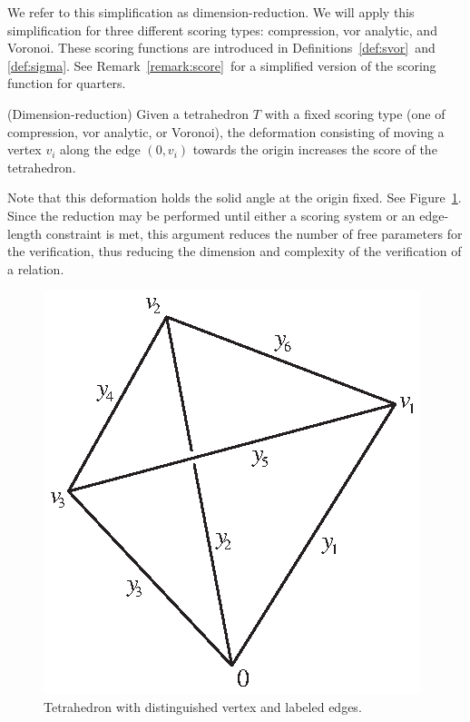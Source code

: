 We refer to this simplification as dimension-reduction.  We will
apply this simplification for three different scoring types:
compression, vor analytic, and Voronoi. These scoring functions are
introduced in Definitions~\ref{def:svor}\tomcite\ and
\ref{def:sigma}\tomcite. See Remark~\ref{remark:score}\tomcite\ for
a simplified version of the scoring function for quarters.

\begin{thm}
\label{thm:dimred}
(Dimension-reduction)  Given a tetrahedron $T$ with a fixed scoring type
(one of compression, vor analytic, or Voronoi),
the deformation
consisting of moving a vertex $v_i$ along the edge $(0, v_i)$ towards the origin increases the
score of the tetrahedron.
\end{thm}

Note that this deformation holds the solid angle at the origin fixed.  See Figure~\ref{fig:tet}.
Since the reduction may be performed until either a scoring system or an edge-length constraint
is met, this argument reduces the number of free
parameters for the verification, thus reducing the dimension and
complexity of the verification of a relation.

\begin{figure}
\begin{center}
\includegraphics{PS/tet}
\end{center}
\caption{Tetrahedron with distinguished vertex and labeled edges.}
\label{fig:tet}
\end{figure}

